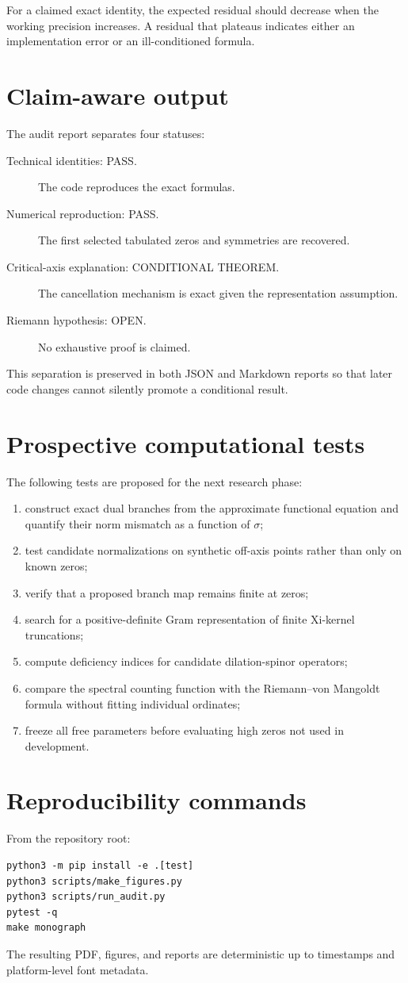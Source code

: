 For a claimed exact identity, the expected residual should decrease when the working precision increases. A residual that plateaus indicates either an implementation error or an ill-conditioned formula.

\section{Claim-aware output}
The audit report separates four statuses:
\begin{description}
\item[Technical identities: PASS.] The code reproduces the exact formulas.
\item[Numerical reproduction: PASS.] The first selected tabulated zeros and symmetries are recovered.
\item[Critical-axis explanation: CONDITIONAL THEOREM.] The cancellation mechanism is exact given the representation assumption.
\item[Riemann hypothesis: OPEN.] No exhaustive proof is claimed.
\end{description}

This separation is preserved in both JSON and Markdown reports so that later code changes cannot silently promote a conditional result.

\section{Prospective computational tests}
The following tests are proposed for the next research phase:
\begin{enumerate}
\item construct exact dual branches from the approximate functional equation and quantify their norm mismatch as a function of $\sigma$;
\item test candidate normalizations on synthetic off-axis points rather than only on known zeros;
\item verify that a proposed branch map remains finite at zeros;
\item search for a positive-definite Gram representation of finite Xi-kernel truncations;
\item compute deficiency indices for candidate dilation-spinor operators;
\item compare the spectral counting function with the Riemann--von Mangoldt formula without fitting individual ordinates;
\item freeze all free parameters before evaluating high zeros not used in development.
\end{enumerate}

\section{Reproducibility commands}
From the repository root:
\begin{verbatim}
python3 -m pip install -e .[test]
python3 scripts/make_figures.py
python3 scripts/run_audit.py
pytest -q
make monograph
\end{verbatim}
The resulting PDF, figures, and reports are deterministic up to timestamps and platform-level font metadata.
